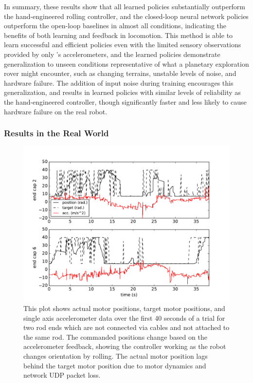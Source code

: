 In summary, these results show that all learned policies substantially outperform the hand-engineered rolling controller, and the closed-loop neural network policies outperform the open-loop baselines in almost all conditions, indicating the benefits of both learning and feedback in \SB{} locomotion. 
This method is able to learn successful and efficient policies even with the limited sensory observations provided by only \SB{}'s accelerometers, and the learned policies demonstrate generalization to unseen conditions representative of what a planetary exploration rover might encounter, such as changing terrains, unstable levels of noise, and hardware failure. 
The addition of input noise during training encourages this generalization, and results in learned policies with similar levels of reliability as the hand-engineered controller, though significantly faster and less likely to cause hardware failure on the real robot.

\subsubsection{Results in the Real World}
\label{sec:realresults}
\begin{figure}[thpb]
    \vspace{-0.1in}
    \centering
    \includegraphics[width=\linewidth]{tex/img/plot_motor}
    \caption{
        \label{fig:commands}
        This plot shows actual motor positions, target motor positions, and 
        single axis accelerometer data over the first 40 seconds of a trial
        for two rod ends which are not connected via cables and not attached
        to the same rod. The commanded positions change based on
        the accelerometer feedback, showing the controller working as the robot
        changes orientation by rolling. The actual motor position  
        lags behind the target motor position due to motor dynamics and network UDP packet loss.
    }
    \vspace{-0.1in}
\end{figure}

